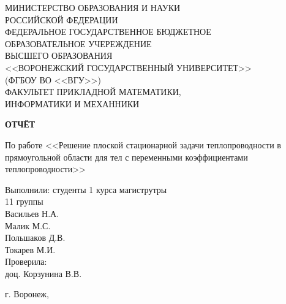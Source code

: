 \begin{titlepage}
  \thispagestyle{empty}
  \begin{center}
  {
    \fontsize{16}{16}
    \selectfont
    \noindent
    МИНИСТЕРСТВО ОБРАЗОВАНИЯ И НАУКИ \\
    РОССИЙСКОЙ ФЕДЕРАЦИИ \\
    ФЕДЕРАЛЬНОЕ ГОСУДАРСТВЕННОЕ БЮДЖЕТНОЕ \\
    ОБРАЗОВАТЕЛЬНОЕ УЧЕРЕЖДЕНИЕ \\
    ВЫСШЕГО ОБРАЗОВАНИЯ \\
    <<ВОРОНЕЖСКИЙ ГОСУДАРСТВЕННЫЙ УНИВЕРСИТЕТ>> \\
    (ФГБОУ ВО <<ВГУ>>) \\
    ФАКУЛЬТЕТ ПРИКЛАДНОЙ МАТЕМАТИКИ, \\
    ИНФОРМАТИКИ И МЕХАННИКИ
  }

  \vspace{2cm}

  {
    \fontsize{16}{16}
    \selectfont
    \textbf{ОТЧЁТ}

    По работе <<Решение плоской стационарной задачи теплопроводности в прямоугольной области для тел с переменными коэффициентами теплопроводности>>
  }

  \vfill

  \begin{flushright}
    Выполнили: студенты 1 курса магиструтры \\
    11 группы \\
    Васильев Н.А. \\
    Малик М.С. \\
    Польшаков Д.В. \\
    Токарев М.И. \\
    Проверила: \\
    доц. Корзунина В.В.
  \end{flushright}

  \vfill

  г. Воронеж, \the\year
  \end{center}
\end{titlepage}

\clearpage

